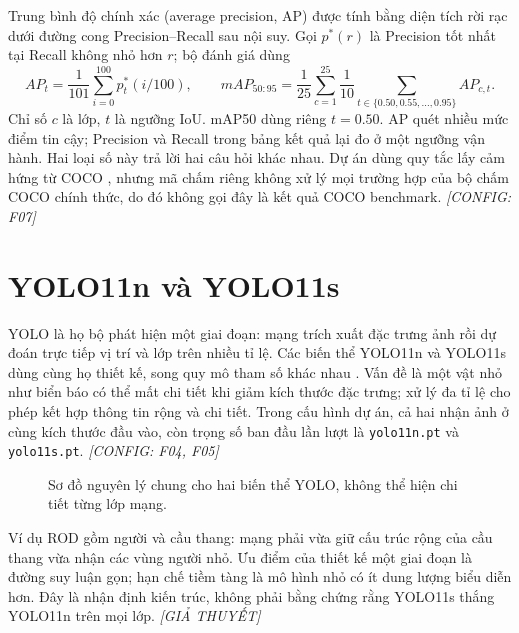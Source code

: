 \documentclass[12pt,a4paper,oneside]{report}
\newcommand{\configured}[1]{\textit{[CONFIG: #1]}}
\newcommand{\hypothesis}{\textit{[GIẢ THUYẾT]}}
\begin{document}
Trung bình độ chính xác (average precision, AP) được tính bằng diện tích rời rạc dưới đường cong Precision--Recall sau nội suy. Gọi $p^*(r)$ là Precision tốt nhất tại Recall không nhỏ hơn $r$; bộ đánh giá dùng
\begin{equation} AP_t=\frac{1}{101}\sum_{i=0}^{100}p^*_t(i/100),\qquad
 mAP_{50:95}=\frac{1}{25}\sum_{c=1}^{25}\frac{1}{10}\sum_{t\in\{0.50,0.55,\ldots,0.95\}}AP_{c,t}.\end{equation}
Chỉ số $c$ là lớp, $t$ là ngưỡng IoU. mAP50 dùng riêng $t=0.50$. AP quét nhiều mức điểm tin cậy; Precision và Recall trong bảng kết quả lại đo ở một ngưỡng vận hành. Hai loại số này trả lời hai câu hỏi khác nhau. Dự án dùng quy tắc lấy cảm hứng từ COCO \cite{coco}, nhưng mã chấm riêng không xử lý mọi trường hợp của bộ chấm COCO chính thức, do đó không gọi đây là kết quả COCO benchmark. \configured{F07}

\section{YOLO11n và YOLO11s}
YOLO là họ bộ phát hiện một giai đoạn: mạng trích xuất đặc trưng ảnh rồi dự đoán trực tiếp vị trí và lớp trên nhiều tỉ lệ. Các biến thể YOLO11n và YOLO11s dùng cùng họ thiết kế, song quy mô tham số khác nhau \cite{yolo11}. Vấn đề là một vật nhỏ như biển báo có thể mất chi tiết khi giảm kích thước đặc trưng; xử lý đa tỉ lệ cho phép kết hợp thông tin rộng và chi tiết. Trong cấu hình dự án, cả hai nhận ảnh ở cùng kích thước đầu vào, còn trọng số ban đầu lần lượt là \texttt{yolo11n.pt} và \texttt{yolo11s.pt}. \configured{F04, F05}

\begin{figure}[htbp]\centering
{}
\caption{Sơ đồ nguyên lý chung cho hai biến thể YOLO, không thể hiện chi tiết từng lớp mạng.}\end{figure}

Ví dụ ROD gồm người và cầu thang: mạng phải vừa giữ cấu trúc rộng của cầu thang vừa nhận các vùng người nhỏ. Ưu điểm của thiết kế một giai đoạn là đường suy luận gọn; hạn chế tiềm tàng là mô hình nhỏ có ít dung lượng biểu diễn hơn. Đây là nhận định kiến trúc, không phải bằng chứng rằng YOLO11s thắng YOLO11n trên mọi lớp. \hypothesis
\end{document}
